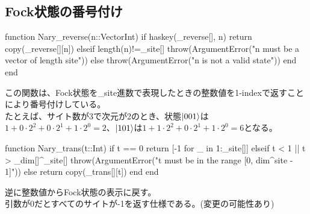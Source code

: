 \documentclass{ltjsarticle}
\begin{document}
\subsection*{Fock状態の番号付け}
\begin{jllisting}
function Nary_reverse(n::Vector{Int})
  if haskey(_reverse[], n)
    return copy(_reverse[][n])
  elseif length(n)!=_site[]
    throw(ArgumentError("n must be a vector of length site"))
  else
    throw(ArgumentError("n is not a valid state"))
  end
end
\end{jllisting}
この関数は、Fock状態を\_site進数で表現したときの整数値を1-indexで返すことにより番号付けしている。\\
たとえば、サイト数が3で次元が2のとき、状態$\ket{001}$は$1+0\cdot 2^2 + 0\cdot 2^1 + 1\cdot 2^0 = 2$、$\ket{101}$は$1+1\cdot 2^2 + 0\cdot 2^1 + 1\cdot 2^0 = 6$となる。\\
\begin{jllisting}
function Nary_trans(t::Int)
  if t == 0
    return [-1 for _ in 1:_site[]]
  elseif t < 1 || t > _dim[]^_site[]
    throw(ArgumentError("t must be in the range [0, dim^site - 1]"))
  else
    return copy(_trans[][t])
  end
end
\end{jllisting}
逆に整数値からFock状態の表示に戻す。\\
引数が0だとすべてのサイトが-1を返す仕様である。(変更の可能性あり)\\
\end{document}
